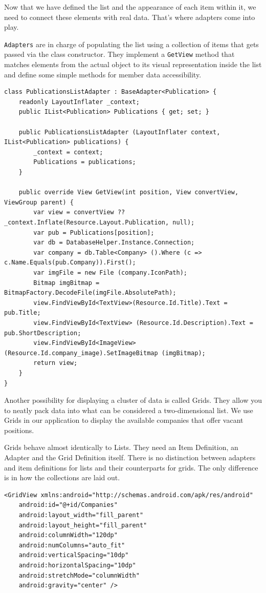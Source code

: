 Now that we have defined the list and the appearance of each item within it, we need to connect these elements with real data. That's where adapters come into play. 

\texttt{Adapters} are in charge of populating the list using a collection of items that gets passed via the class constructor. They implement a \texttt{GetView} method that matches elements from the actual object to its visual representation inside the list and define some simple methods for member data accessibility.

\lstset{language=[Sharp]C}

\begin{lstlisting}[frame=lt,caption=PublicationsListAdapter.cs, label={list:pubList_cs}]
class PublicationsListAdapter : BaseAdapter<Publication> {
	readonly LayoutInflater _context; 
	public IList<Publication> Publications { get; set; }

	public PublicationsListAdapter (LayoutInflater context, IList<Publication> publications) {
		_context = context;
		Publications = publications;		
	}

	public override View GetView(int position, View convertView, ViewGroup parent) {
		var view = convertView ?? _context.Inflate(Resource.Layout.Publication, null);
		var pub = Publications[position];
		var db = DatabaseHelper.Instance.Connection;
		var company = db.Table<Company> ().Where (c => c.Name.Equals(pub.Company)).First();
		var imgFile = new File (company.IconPath);
		Bitmap imgBitmap = BitmapFactory.DecodeFile(imgFile.AbsolutePath);
		view.FindViewById<TextView>(Resource.Id.Title).Text = pub.Title; 
		view.FindViewById<TextView> (Resource.Id.Description).Text = pub.ShortDescription;
		view.FindViewById<ImageView> (Resource.Id.company_image).SetImageBitmap (imgBitmap);
		return view; 
	}
}
\end{lstlisting}

Another possibility for displaying a cluster of data is called Grids. They allow you to neatly pack data into what can be considered a two-dimensional list. We use Grids in our application to display the available companies that offer vacant positions.

Grids behave almost identically to Lists. They need an Item Definition, an Adapter and the Grid Definition itself. There is no distinction between adapters and item definitions for lists and their counterparts for grids. The only difference is in how the collections are laid out.

\lstset{language=XML}
\begin{lstlisting}[frame=lt,caption=CompaniesGrid.axml, label={list:grid_xml}]
<GridView xmlns:android="http://schemas.android.com/apk/res/android"
    android:id="@+id/Companies"
    android:layout_width="fill_parent"
    android:layout_height="fill_parent"
    android:columnWidth="120dp"
    android:numColumns="auto_fit"
    android:verticalSpacing="10dp"
    android:horizontalSpacing="10dp"
    android:stretchMode="columnWidth"
    android:gravity="center" />
\end{lstlisting}

